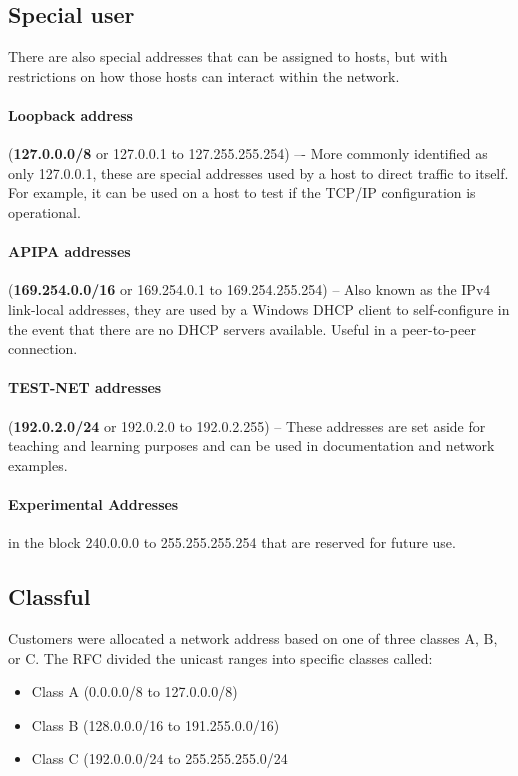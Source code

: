 \subsection{Special user}

There are also special addresses that can be assigned to hosts, but with restrictions on how those hosts can interact within the network. 

\paragraph{Loopback address} (\textbf{127.0.0.0/8} or 127.0.0.1 to 127.255.255.254) –- More commonly identified as only 127.0.0.1, these are special addresses used by a host to direct traffic to itself. For example, it can be used on a host to test if the TCP/IP configuration is operational. 

\paragraph{APIPA addresses} (\textbf{169.254.0.0/16} or 169.254.0.1 to 169.254.255.254) – Also known as the IPv4 link-local addresses, they are used by a Windows DHCP client to self-configure in the event that there are no DHCP servers available. Useful in a peer-to-peer connection.

\paragraph{TEST-NET addresses} (\textbf{192.0.2.0/24} or 192.0.2.0 to 192.0.2.255) – These addresses are set aside for teaching and learning purposes and can be used in documentation and network examples. 

\paragraph{Experimental Addresses} in the block 240.0.0.0 to 255.255.255.254 that are reserved for future use.

\subsection{Classful}

Customers were allocated a network address based on one of three classes A, B, or C. The RFC divided the unicast ranges into specific classes called:

\begin{itemize}
\item Class A (0.0.0.0/8 to 127.0.0.0/8)
\item Class B (128.0.0.0/16 to 191.255.0.0/16)
\item Class C (192.0.0.0/24 to 255.255.255.0/24
\end{itemize}

